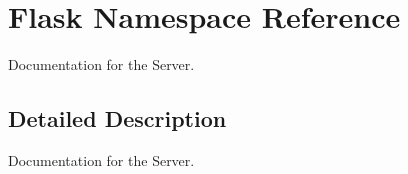 \hypertarget{namespace_flask}{}\section{Flask Namespace Reference}
\label{namespace_flask}


Documentation for the Server.  




\subsection{Detailed Description}
Documentation for the Server. 